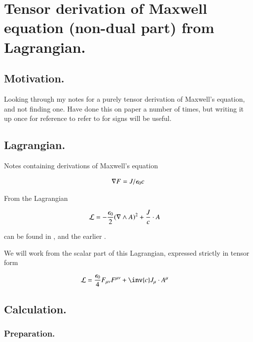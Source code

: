 \chapter{Tensor derivation of Maxwell equation (non-dual part) from Lagrangian. }
\label{chap:maxwellTensorFromLagrangian}
\date{April 20, 2009.  maxwellTensorFromLagrangian.tex}

\section{Motivation. }

Looking through my notes for a purely tensor derivation of Maxwell's equation, and not finding one.  Have done this on
paper a number of times, but writing it up once for reference to refer to for signs will be useful.

\section{Lagrangian. }

Notes containing derivations of Maxwell's equation

\begin{align}\label{eqn:maxTenLag:maxwell}
\nabla F = J/\epsilon_0 c
\end{align}

From the Lagrangian

\begin{align}\label{eqn:maxTenLag:maxlag}
\mathcal{L} &= -\frac{\epsilon_0}{2} (\nabla \wedge A)^2 + \frac{J}{c} \cdot A
\end{align}

can be found in , and the earlier .

We will work from the scalar part of this Lagrangian, expressed strictly in tensor form

\begin{align}
\LL &= \frac{\epsilon_0}{4} F_{\mu\nu}F^{\mu\nu} + \inv{c} J_\mu \cdot A^\mu
\end{align}

\section{Calculation. }

\subsection{Preparation. }

